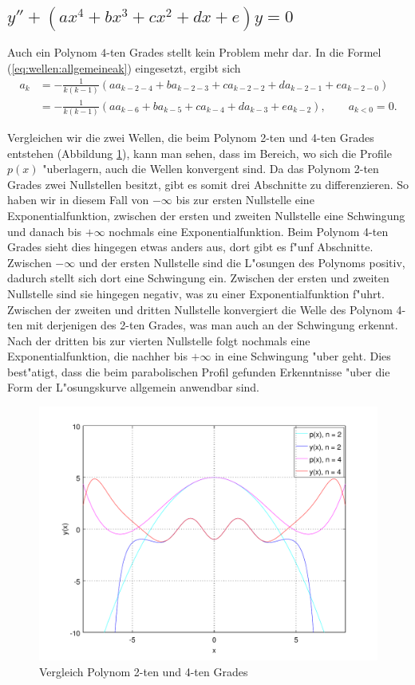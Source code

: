 \subsection{\texorpdfstring{$y''+(ax^4+bx^3+cx^2+dx+e)y = 
0$}{y''-(ax4+bx3+cx2+dx+e)y = 0}}

Auch ein Polynom $4$-ten Grades stellt kein Problem mehr dar. In die 
Formel (\ref{eq:wellen:allgemeineak}) eingesetzt, ergibt sich
\begin{equation*}
	\begin{split}
		a_k &= -\frac{1}{k(k-1)} (aa_{k-2-4} + 
		ba_{k-2-3} + ca_{k-2-2} + da_{k-2-1} +ea_{k-2-0})
		\\
		&= -\frac{1}{k(k-1)} (aa_{k-6} + ba_{k-5} + 
		ca_{k-4} + da_{k-3} +ea_{k-2}), \qquad a_{k<0} = 0.
	\end{split}
\end{equation*}

Vergleichen wir die zwei Wellen, die beim Polynom 2-ten und 4-ten Grades 
entstehen (Abbildung \ref{fig:wellen:poly4-dgl}), kann man sehen, 
dass im Bereich, wo sich die Profile $p(x)$ "uberlagern, auch die Wellen 
konvergent sind. Da das Polynom 2-ten Grades zwei Nullstellen besitzt, gibt es 
somit drei Abschnitte zu differenzieren. So haben wir in diesem Fall von 
$-\infty$ bis zur ersten Nullstelle eine Exponentialfunktion, zwischen der 
ersten und zweiten Nullstelle eine Schwingung und danach bis $+\infty$ nochmals 
eine Exponentialfunktion. Beim Polynom 4-ten Grades sieht dies hingegen etwas 
anders aus, dort gibt es f"unf Abschnitte. Zwischen $-\infty$ und der ersten 
Nullstelle sind die L"osungen des Polynoms positiv, dadurch stellt sich dort 
eine Schwingung ein. Zwischen der ersten und zweiten Nullstelle sind sie 
hingegen negativ, was zu einer Exponentialfunktion f"uhrt. Zwischen der zweiten 
und dritten Nullstelle konvergiert die Welle des Polynom 4-ten mit derjenigen 
des 2-ten Grades, was man auch an der Schwingung erkennt. Nach der dritten bis 
zur vierten Nullstelle folgt nochmals eine Exponentialfunktion, die nachher bis 
$+\infty$ in eine Schwingung "uber geht. Dies best"atigt, dass die beim 
parabolischen Profil gefunden Erkenntnisse "uber die Form der L"osungskurve 
allgemein anwendbar sind.

\begin{figure}
	\includegraphics[width=1\hsize]{./wellen/images/allgemein/n4.pdf}
	\caption{Vergleich Polynom 2-ten und 4-ten Grades}
	\label{fig:wellen:poly4-dgl}
\end{figure}
